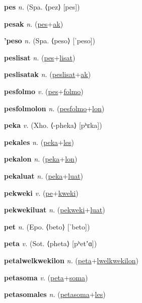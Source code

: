 \textbf{\hypertarget{pes}{pes}} \textit{n.} (Spa. ⟨pez⟩ [pes])


\textbf{\hypertarget{pesak}{pesak}} \textit{n.} (\hyperlink{pes}{pes}+\allowbreak \hyperlink{ak}{ak})


\textbf{\hypertarget{'peso}{'peso}} \textit{n.} (Spa. ⟨peso⟩ [ˈpeso])


\textbf{\hypertarget{peslisat}{peslisat}} \textit{n.} (\hyperlink{pes}{pes}+\allowbreak \hyperlink{lisat}{lisat})


\textbf{\hypertarget{peslisatak}{peslisatak}} \textit{n.} (\hyperlink{peslisat}{peslisat}+\allowbreak \hyperlink{ak}{ak})


\textbf{\hypertarget{pesfolmo}{pesfolmo}} \textit{v.} (\hyperlink{pes}{pes}+\allowbreak \hyperlink{folmo}{folmo})


\textbf{\hypertarget{pesfolmolon}{pesfolmolon}} \textit{n.} (\hyperlink{pesfolmo}{pesfolmo}+\allowbreak \hyperlink{lon}{lon})


\textbf{\hypertarget{peka}{peka}} \textit{v.} (Xho. ⟨-pheka⟩ [pʰɛka])


\textbf{\hypertarget{pekales}{pekales}} \textit{n.} (\hyperlink{peka}{peka}+\allowbreak \hyperlink{les}{les})


\textbf{\hypertarget{pekalon}{pekalon}} \textit{n.} (\hyperlink{peka}{peka}+\allowbreak \hyperlink{lon}{lon})


\textbf{\hypertarget{pekaluat}{pekaluat}} \textit{n.} (\hyperlink{peka}{peka}+\allowbreak \hyperlink{luat}{luat})


\textbf{\hypertarget{pekweki}{pekweki}} \textit{v.} (\hyperlink{pe}{pe}+\allowbreak \hyperlink{kweki}{kweki})


\textbf{\hypertarget{pekwekiluat}{pekwekiluat}} \textit{n.} (\hyperlink{pekweki}{pekweki}+\allowbreak \hyperlink{luat}{luat})


\textbf{\hypertarget{pet}{pet}} \textit{n.} (Epo. ⟨beto⟩ [ˈbeto])


\textbf{\hypertarget{peta}{peta}} \textit{v.} (Sot. ⟨pheta⟩ [pʰetʼɑ])


\textbf{\hypertarget{petalwelkwekilon}{petalwelkwekilon}} \textit{n.} (\hyperlink{peta}{peta}+\allowbreak \hyperlink{lwelkwekilon}{lwelkwekilon})


\textbf{\hypertarget{petasoma}{petasoma}} \textit{v.} (\hyperlink{peta}{peta}+\allowbreak \hyperlink{soma}{soma})


\textbf{\hypertarget{petasomales}{petasomales}} \textit{n.} (\hyperlink{petasoma}{petasoma}+\allowbreak \hyperlink{les}{les})


